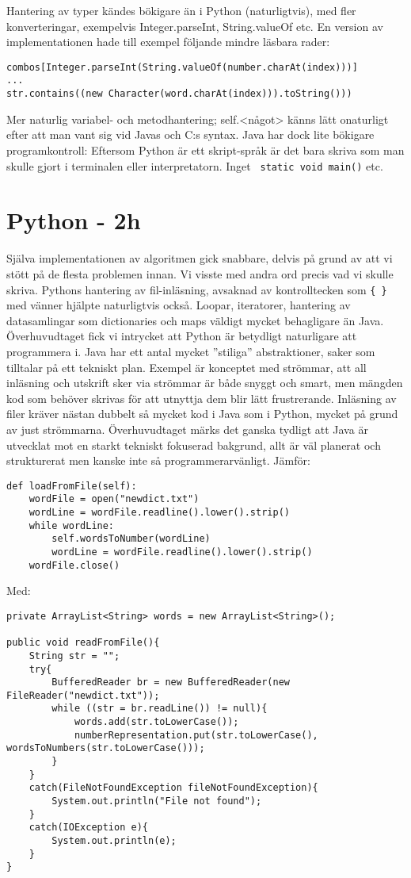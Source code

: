 \documentclass[a4paper, twoside, 11pt]{article}
\begin{document}
Hantering av typer kändes bökigare än i Python (naturligtvis), med fler konverteringar, exempelvis Integer.parseInt, String.valueOf etc. En version av implementationen hade till exempel följande mindre läsbara rader:\\
\begin{verbatim}
combos[Integer.parseInt(String.valueOf(number.charAt(index)))]
...
str.contains((new Character(word.charAt(index))).toString()))
\end{verbatim}

Mer naturlig variabel- och metodhantering; self.<något> känns lätt onaturligt efter att man vant sig vid Javas och C:s syntax. Java har dock lite bökigare programkontroll: Eftersom Python är ett skript-språk är det bara skriva som man skulle gjort i terminalen eller interpretatorn. Inget \verb| static void main()| etc.

\section{Python - 2h}

Själva implementationen av algoritmen gick snabbare, delvis på grund av att vi stött på de flesta problemen innan. Vi visste med andra ord precis vad vi skulle skriva. Pythons hantering av fil-inläsning, avsaknad av kontrolltecken som \verb|{ }| med vänner hjälpte naturligtvis också. Loopar, iteratorer, hantering av datasamlingar som dictionaries och maps väldigt mycket behagligare än Java. Överhuvudtaget fick vi intrycket att Python är betydligt naturligare att programmera i. Java har ett antal mycket ''stiliga'' abstraktioner, saker som tilltalar på ett tekniskt plan. Exempel är konceptet med strömmar, att all inläsning och utskrift sker via strömmar är både snyggt och smart, men mängden kod som behöver skrivas för att utnyttja dem blir lätt frustrerande. Inläsning av filer kräver nästan dubbelt så mycket kod i Java som i Python, mycket på grund av just strömmarna. Överhuvudtaget märks det ganska tydligt att Java är utvecklat mot en starkt tekniskt fokuserad bakgrund, allt är väl planerat och strukturerat men kanske inte så programmerarvänligt. Jämför:

\begin{verbatim}
def loadFromFile(self):
	wordFile = open("newdict.txt")
	wordLine = wordFile.readline().lower().strip()
	while wordLine:
		self.wordsToNumber(wordLine)
		wordLine = wordFile.readline().lower().strip()
	wordFile.close()
\end{verbatim}
\newpage
Med:
\begin{verbatim}
private ArrayList<String> words = new ArrayList<String>();

public void readFromFile(){
	String str = "";
	try{
		BufferedReader br = new BufferedReader(new FileReader("newdict.txt"));
		while ((str = br.readLine()) != null){
			words.add(str.toLowerCase());
			numberRepresentation.put(str.toLowerCase(), wordsToNumbers(str.toLowerCase()));
		}
	}
	catch(FileNotFoundException fileNotFoundException){
		System.out.println("File not found");
	}
	catch(IOException e){
		System.out.println(e);
	}
}
\end{verbatim}
\end{document}
